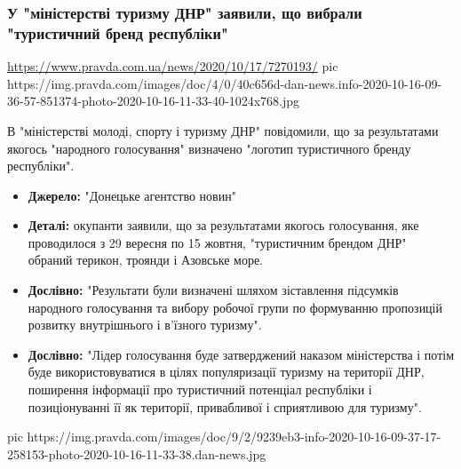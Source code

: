  
 

\subsubsection{У "міністерстві туризму ДНР" заявили, що вибрали "туристичний бренд республіки"}

\url{https://www.pravda.com.ua/news/2020/10/17/7270193/}
\ifcmt
pic https://img.pravda.com/images/doc/4/0/40c656d-dan-news.info-2020-10-16-09-36-57-851374-photo-2020-10-16-11-33-40-1024x768.jpg
\fi

В "міністерстві молоді, спорту і туризму ДНР" повідомили, що за результатами якогось "народного голосування" визначено "логотип туристичного бренду республіки".

\begin{itemize}
\item \textbf{Джерело:} "Донецьке агентство новин"

\item \textbf{Деталі:} окупанти заявили, що за результатами якогось
        голосування, яке проводилося з 29 вересня по 15 жовтня, "туристичним
        брендом ДНР" обраний терикон, троянди і Азовське море.

\item \textbf{Дослівно:} "Результати були визначені шляхом зіставлення
        підсумків народного голосування та вибору робочої групи по формуванню
        пропозицій розвитку внутрішнього і в'їзного туризму".

\item \textbf{Дослівно:} "Лідер голосування буде затверджений наказом
        міністерства і потім буде використовуватися в цілях популяризації
        туризму на території ДНР, поширення інформації про туристичний
        потенціал республіки і позиціонуванні її як території, привабливої і
        сприятливою для туризму".
\end{itemize}

\ifcmt
pic https://img.pravda.com/images/doc/9/2/9239eb3-info-2020-10-16-09-37-17-258153-photo-2020-10-16-11-33-38.dan-news.jpg
\fi
